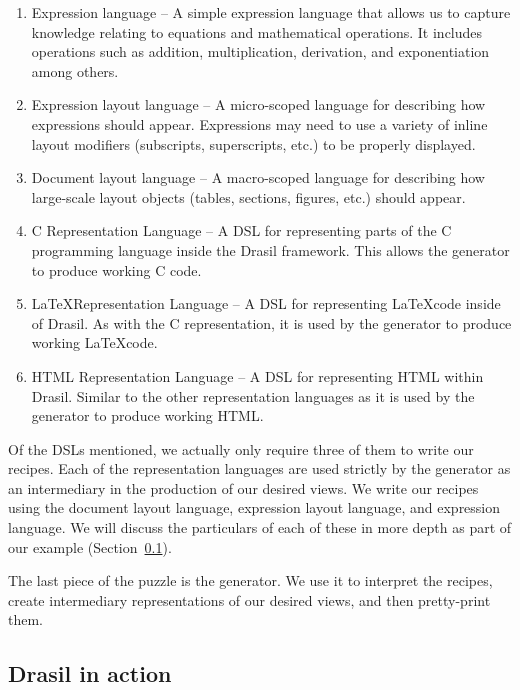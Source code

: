 \documentclass[preprint, 10pt]{sigplanconf}
\begin{document}
\begin{enumerate}
\item Expression language -- A simple expression language that allows us to
capture knowledge relating to equations and mathematical operations. It includes
operations such as addition, multiplication, derivation, and exponentiation
among others.

\item Expression layout language -- A micro-scoped language for describing how
expressions should appear. Expressions may need to use a variety of inline
layout modifiers (subscripts, superscripts, etc.) to be properly displayed.

\item Document layout language -- A macro-scoped language for describing how
large-scale layout objects (tables, sections, figures, etc.) should appear.

\item C Representation Language -- A DSL for representing parts of the C
programming language inside the Drasil framework. This allows the generator to
produce working C code.

\item \LaTeX Representation Language -- A DSL for representing \LaTeX code
inside of Drasil. As with the C representation, it is used by the generator to
produce working \LaTeX code.

\item HTML Representation Language -- A DSL for representing HTML within Drasil.
Similar to the other representation languages as it is used by the
generator to produce working HTML.
\end{enumerate}

Of the DSLs mentioned, we actually only require three of them to write our
recipes. Each of the representation languages are used strictly by the generator
as an intermediary in the production of our desired views. We write our recipes
using the document layout language, expression layout language, and expression
language. We will discuss the particulars of each of these in more depth as part of
our example (Section~\ref{subsec:example}).

The last piece of the puzzle is the generator. We use it to interpret the
recipes, create intermediary representations of our desired views, and then
pretty-print them.

\subsection{Drasil in action} 
\label{subsec:example}
\end{document}
